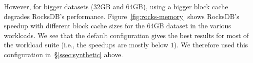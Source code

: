 {However, for  bigger datasets (32GB and 64GB),   using a  bigger 
block cache degrades  RocksDB's performance. Figure~\ref{fig:rocks-memory} shows 
RocksDB's speedup with different block cache sizes for the 64GB dataset in the various workloads. 
We see that the default configuration gives the best results for most of the workload suite (i.e., the 
speedups are mostly below $1$). We therefore used this configuration  in~\S\ref{ssec:synthetic} above.   


} %


  